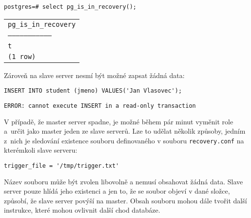 \begin{lstlisting}
postgres=# select pg_is_in_recovery();
\end{lstlisting}
\begin{table}[H]
  \begin{center}
    \label{pgHba}
    \begin{tabular}{l}
      \texttt{pg\_is\_in\_recovery}\\
      \texttt{---------------------------------}\\
      \texttt{t}\\
      \texttt{(1 row)}\\
    \end{tabular}
  \end{center}
\end{table}

Zároveň na slave server nesmí být možné zapsat žádná data:

\begin{lstlisting}
INSERT INTO student (jmeno) VALUES('Jan Vlasovec');
\end{lstlisting}
\begin{lstlisting}[keywordstyle=\color{black},identifierstyle=\color{black},stringstyle=\color{black}]
ERROR: cannot execute INSERT in a read-only transaction
\end{lstlisting}

V případě, že master server spadne, je možné během pár minut vyměnit role a~určit
jako master jeden ze slave serverů. Lze to udělat několik způsoby, jedním z~nich
je sledování existence souboru definovaného v souboru \texttt{recovery.conf} na
kterémkoli slave serveru:

\begin{lstlisting}
trigger_file = '/tmp/trigger.txt'
\end{lstlisting}

Název souboru může být zvolen libovolně a nemusí obsahovat žádná data. Slave
server pouze hlídá jeho existenci a jen to, že se soubor objeví v dané složce,
způsobí, že slave server povýší na master. Obsah souboru mohou dále tvořit další
instrukce, které mohou ovlivnit další chod databáze.

